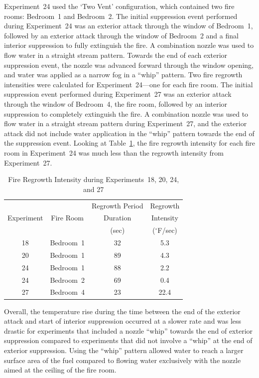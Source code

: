 \documentclass[12pt,oneside]{book}
\begin{document}
Experiment~24 used the `Two Vent' configuration, which contained two fire rooms: Bedroom~1 and Bedroom~2. The initial suppression event performed during Experiment~24 was an exterior attack through the window of Bedroom~1, followed by an exterior attack through the window of Bedroom~2 and a final interior suppression to fully extinguish the fire. A combination nozzle was used to flow water in a straight stream pattern. Towards the end of each exterior suppression event, the nozzle was advanced forward through the window opening, and water was applied as a narrow fog in a ``whip'' pattern. Two fire regrowth intensities were calculated for Experiment~24---one for each fire room. The initial suppression event performed during Experiment~27 was an exterior attack through the window of Bedroom~4, the fire room, followed by an interior suppression to completely extinguish the fire. A combination nozzle was used to flow water in a straight stream pattern during Experiment~27, and the exterior attack did not include water application in the ``whip'' pattern towards the end of the suppression event. Looking at Table~\ref{table:regrowth_intensity}, the fire regrowth intensity for each fire room in Experiment~24 was much less than the regrowth intensity from Experiment~27.

\begin{table}[H]
\centering
\caption{Fire Regrowth Intensity during Experiments~18, 20, 24, and 27}
\begin{tabular}{|c|c|c|c|} 
\hline
\multirow{3}{*}{Experiment} & \multirow{3}{*}{Fire Room} 	& Regrowth Period & Regrowth  \\ 
							& 								& Duration 		  & Intensity \\
							& 								& (sec) 		  & ($^\circ$F/sec) \\							
\hline \hline
18 							& Bedroom~1 					& 32 			  & 5.3 	\\ \hline
20 							& Bedroom~1 					& 89 			  & 4.3 	\\ \hline
24 							& Bedroom~1 					& 88 			  & 2.2 	\\ \hline
24 							& Bedroom~2 					& 69 			  & 0.4 	\\ \hline
27 							& Bedroom~4 					& 23 			  & 22.4 	\\ \hline
\end{tabular}
\label{table:regrowth_intensity}
\end{table}

Overall, the temperature rise during the time between the end of the exterior attack and start of interior suppression occurred at a slower rate and was less drastic for experiments that included a nozzle ``whip'' towards the end of exterior suppression compared to experiments that did not involve a ``whip'' at the end of exterior suppression. Using the ``whip'' pattern allowed water to reach a larger surface area of the fuel compared to flowing water exclusively with the nozzle aimed at the ceiling of the fire room.
\end{document}
